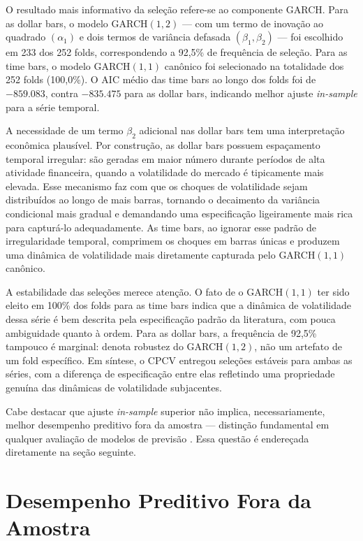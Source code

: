 O resultado mais informativo da seleção refere-se ao componente GARCH. Para as dollar bars,
o modelo GARCH$(1,2)$ — com um termo de inovação ao quadrado $(\alpha_1)$ e dois termos
de variância defasada $(\beta_1, \beta_2)$ — foi escolhido em 233 dos 252 folds,
correspondendo a 92,5\% de frequência de seleção. Para as time bars, o modelo GARCH$(1,1)$
canônico foi selecionado na totalidade dos 252 folds (100,0\%). O AIC médio das time bars
ao longo dos folds foi de $-859.083$, contra $-835.475$ para as dollar bars, indicando
melhor ajuste \textit{in-sample} para a série temporal.

A necessidade de um termo $\beta_2$ adicional nas dollar bars tem uma interpretação
econômica plausível. Por construção, as dollar bars possuem espaçamento temporal irregular:
são geradas em maior número durante períodos de alta atividade financeira, quando a
volatilidade do mercado é tipicamente mais elevada. Esse mecanismo faz com que os choques
de volatilidade sejam distribuídos ao longo de mais barras, tornando o decaimento da
variância condicional mais gradual e demandando uma especificação ligeiramente mais rica
para capturá-lo adequadamente. As time bars, ao ignorar esse padrão de irregularidade
temporal, comprimem os choques em barras únicas e produzem uma dinâmica de volatilidade
mais diretamente capturada pelo GARCH$(1,1)$ canônico.

A estabilidade das seleções merece atenção. O fato de o GARCH$(1,1)$ ter sido eleito
em 100\% dos folds para as time bars indica que a dinâmica de volatilidade dessa série
é bem descrita pela especificação padrão da literatura, com pouca ambiguidade quanto à
ordem. Para as dollar bars, a frequência de 92,5\% tampouco é marginal: denota robustez
do GARCH$(1,2)$, não um artefato de um fold específico. Em síntese, o CPCV entregou
seleções estáveis para ambas as séries, com a diferença de especificação entre elas
refletindo uma propriedade genuína das dinâmicas de volatilidade subjacentes.

Cabe destacar que ajuste \textit{in-sample} superior não implica, necessariamente,
melhor desempenho preditivo fora da amostra — distinção fundamental em qualquer
avaliação de modelos de previsão \citep{Diebold2015}. Essa questão é endereçada
diretamente na seção seguinte.

\section{Desempenho Preditivo Fora da Amostra}
\label{sec:desempenho_previsao}

